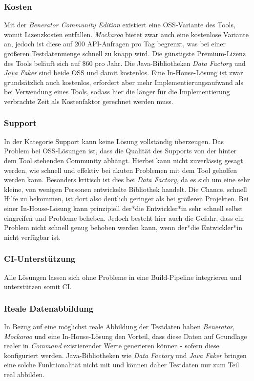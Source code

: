 \subsubsection*{Kosten}
Mit der \textit{Benerator Community Edition} existiert eine \ac{OSS}-Variante des Tools, womit Lizenzkosten entfallen. \cite{beneratorce:2022} \cite{singh:2015} \textit{Mockaroo} bietet zwar auch eine kostenlose Variante an, jedoch ist diese auf 200 \ac{API}-Anfragen pro Tag begrenzt, was bei einer größeren Testdatenmenge schnell zu knapp wird. Die günstigste Premium-Lizenz des Tools beläuft sich auf \$60 pro Jahr. Die Java-Bibliotheken \textit{Data Factory} und \textit{Java Faker} sind beide \ac{OSS} und damit kostenlos. Eine In-House-Lösung ist zwar grundsätzlich auch kostenlos, erfordert aber mehr Implementierungsaufwand als bei Verwendung eines Tools, sodass hier die länger für die Implementierung verbrachte Zeit als Kostenfaktor gerechnet werden muss.

\subsubsection*{Support}
In der Kategorie Support kann keine Lösung vollständig überzeugen. Das Problem bei \ac{OSS}-Lösungen ist, dass die Qualität des Supports von der hinter dem Tool stehenden Community abhängt. Hierbei kann nicht zuverlässig gesagt werden, wie schnell und effektiv bei akuten Problemen mit dem Tool geholfen werden kann. Besonders kritisch ist dies bei \textit{Data Factory}, da es sich um eine sehr kleine, von wenigen Personen entwickelte Bibliothek handelt. Die Chance, schnell Hilfe zu bekommen, ist dort also deutlich geringer als bei größeren Projekten. Bei einer In-House-Lösung kann prinzipiell der*die Entwickler*in sehr schnell selbst eingreifen und Probleme beheben. Jedoch besteht hier auch die Gefahr, dass ein Problem nicht schnell genug behoben werden kann, wenn der*die Entwickler*in nicht verfügbar ist.

\subsubsection*{\ac{CI}-Unterstützung}
Alle Lösungen lassen sich ohne Probleme in eine Build-Pipeline integrieren und unterstützen somit \ac{CI}.

\subsubsection*{Reale Datenabbildung}
In Bezug auf eine möglichst reale Abbildung der Testdaten haben \textit{Benerator}, \textit{Mockaroo} und eine In-House-Lösung den Vorteil, dass diese Daten auf Grundlage realer in \textit{Command} existierender Werte generieren können - sofern diese konfiguriert werden. Java-Bibliotheken wie \textit{Data Factory} und \textit{Java Faker} bringen eine solche Funktionalität nicht mit und können daher Testdaten nur zum Teil real abbilden.

